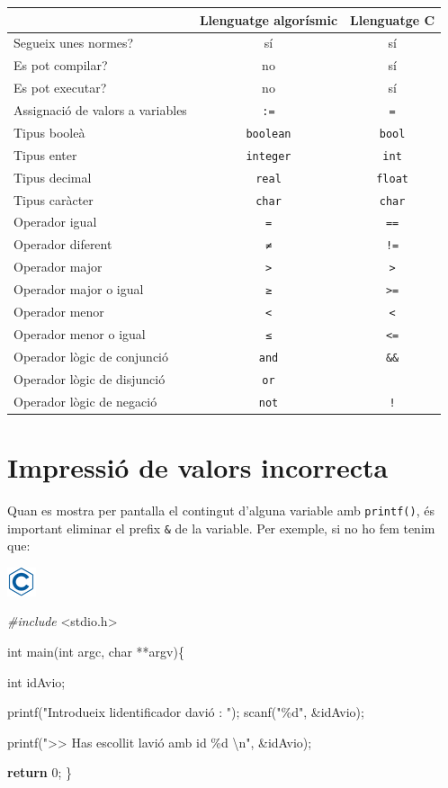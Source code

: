 \documentclass[]{book}
\newenvironment{Shaded}{\begin{snugshade}}{\end{snugshade}}
\newcommand{\ControlFlowTok}[1]{\textcolor[rgb]{0.13,0.29,0.53}{\textbf{#1}}}
\newcommand{\DataTypeTok}[1]{\textcolor[rgb]{0.13,0.29,0.53}{#1}}
\newcommand{\DecValTok}[1]{\textcolor[rgb]{0.00,0.00,0.81}{#1}}
\newcommand{\ImportTok}[1]{#1}
\newcommand{\NormalTok}[1]{#1}
\newcommand{\PreprocessorTok}[1]{\textcolor[rgb]{0.56,0.35,0.01}{\textit{#1}}}
\newcommand{\SpecialCharTok}[1]{\textcolor[rgb]{0.00,0.00,0.00}{#1}}
\newcommand{\StringTok}[1]{\textcolor[rgb]{0.31,0.60,0.02}{#1}}
\begin{document}
\begin{longtable}[]{@{}lcc@{}}
\toprule
& Llenguatge algorísmic & Llenguatge C\tabularnewline
\midrule
\endhead
Segueix unes normes? & sí & sí\tabularnewline
Es pot compilar? & no & sí\tabularnewline
Es pot executar? & no & sí\tabularnewline
Assignació de valors a variables & \texttt{:=} & \texttt{=}\tabularnewline
Tipus booleà & \texttt{boolean} & \texttt{bool}\tabularnewline
Tipus enter & \texttt{integer} & \texttt{int}\tabularnewline
Tipus decimal & \texttt{real} & \texttt{float}\tabularnewline
Tipus caràcter & \texttt{char} & \texttt{char}\tabularnewline
Operador igual & \texttt{=} & \texttt{==}\tabularnewline
Operador diferent & \texttt{≠} & \texttt{!=}\tabularnewline
Operador major & \texttt{\textgreater{}} & \texttt{\textgreater{}}\tabularnewline
Operador major o igual & \texttt{≥} & \texttt{\textgreater{}=}\tabularnewline
Operador menor & \texttt{\textless{}} & \texttt{\textless{}}\tabularnewline
Operador menor o igual & \texttt{≤} & \texttt{\textless{}=}\tabularnewline
Operador lògic de conjunció & \texttt{and} & \texttt{\&\&}\tabularnewline
Operador lògic de disjunció & \texttt{or} & \texttt{\textbar{}\textbar{}}\tabularnewline
Operador lògic de negació & \texttt{not} & \texttt{!}\tabularnewline
\bottomrule
\end{longtable}

\hypertarget{impressio-de-valors-incorrecta}{%
\section{Impressió de valors incorrecta}\label{impressio-de-valors-incorrecta}}

Quan es mostra per pantalla el contingut d'alguna variable amb \texttt{printf()}, és important eliminar el prefix \texttt{\&} de la variable. Per exemple, si no ho fem tenim que:

\includegraphics{./img/c.png}

\begin{Shaded}
\begin{Highlighting}[]
\PreprocessorTok{\#include }\ImportTok{\textless{}stdio.h\textgreater{}}

\DataTypeTok{int}\NormalTok{ main(}\DataTypeTok{int}\NormalTok{ argc, }\DataTypeTok{char}\NormalTok{ **argv)\{}

    \DataTypeTok{int}\NormalTok{ idAvio;}

\NormalTok{    printf(}\StringTok{"Introdueix l\textquotesingle{}identificador d\textquotesingle{}avió : "}\NormalTok{);}
\NormalTok{    scanf(}\StringTok{"\%d"}\NormalTok{, \&idAvio);}
    
\NormalTok{    printf(}\StringTok{"\textgreater{}\textgreater{} Has escollit l\textquotesingle{}avió amb id \%d }\SpecialCharTok{\textbackslash{}n}\StringTok{"}\NormalTok{, \&idAvio);}

    \ControlFlowTok{return} \DecValTok{0}\NormalTok{;}
\NormalTok{\}}
\end{Highlighting}
\end{Shaded}
\end{document}
